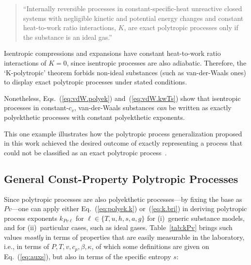     \begin{quote}
        ``Internally reversible processes in constant-specific-heat  unreactive  closed  systems
        with negligible kinetic and potential energy changes  and  constant  heat-to-work  ratio
        interactions, $K$, are exact polytropic processes only if  the  substance  is  an  ideal
        gas.''
    \end{quote}

    Isentropic compressions and expansions have  constant  heat-to-work  ratio  interactions  of
    $K=0$, since isentropic processes are also adiabatic. Therefore, the `K-polytropic'  theorem
    forbids non-ideal substances (such  as  van-der-Waals  ones)  to  display  exact  polytropic
    processes under stated conditions.

    Nonetheless,  Eqs.~(\ref{eq:vdW.polyek})  and~(\ref{eq:vdW.kwTs})   show   that   isentropic
    processes in constant-$c_v$, van-der-Waals  substances  \emph{can}  be  written  as  exactly
    polyekthetic processes with constant polyekthetic exponents.

    This one example illustrates how the polytropic process generalization proposed in this work
    achieved the desired outcome of exactly representing a process that could not be  classified
    as an exact polytropic process~\cite{2020-NaaktgeborenC-engrXiv}.

    \subsection{General Const-Property Polytropic Processes}

    Since  polytropic  processes  are  also  polyekthetic  processes---by  fixing  the  base  as
    $Pv$---one  can  apply  either  Eq.~(\ref{eq:polyek.k})  or~(\ref{eq:k.bri})   in   deriving
    polytropic process exponents  $k_{Pv\ell}$  for  $\ell  \in  \{T,  u,  h,  s,  a,  g\}$  for
    (i)~generic  substance  models,  and  for  (ii)~particular  cases,  such  as  ideal   gases.
    Table~\ref{tab:kPv} brings such values \emph{mostly} in terms of properties that are  easily
    measurable in the laboratory, i.e., in terms of ${P, T, v, c_p, \beta,  \kappa}$,  of  which
    some definitions are given on Eq.~(\ref{eq:auxs}), but also in terms of the specific entropy
    $s$:

